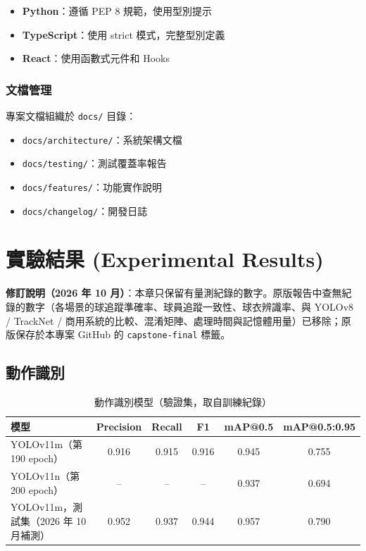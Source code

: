 \documentclass[a4paper,14pt,oneside]{article}
\begin{document}
\begin{itemize}
    \item \textbf{Python}：遵循 PEP 8 規範，使用型別提示
    \item \textbf{TypeScript}：使用 strict 模式，完整型別定義
    \item \textbf{React}：使用函數式元件和 Hooks
\end{itemize}

\subsubsection{文檔管理}

專案文檔組織於 \texttt{docs/} 目錄：

\begin{itemize}
    \item \texttt{docs/architecture/}：系統架構文檔
    \item \texttt{docs/testing/}：測試覆蓋率報告
    \item \texttt{docs/features/}：功能實作說明
    \item \texttt{docs/changelog/}：開發日誌
\end{itemize}

\newpage
\section{實驗結果 (Experimental Results)}\label{sec:results}

\textbf{修訂說明（2026 年 10 月）}：本章只保留有量測紀錄的數字。原版報告中查無紀錄的數字（各場景的球追蹤準確率、球員追蹤一致性、球衣辨識率、與 YOLOv8 / TrackNet / 商用系統的比較、混淆矩陣、處理時間與記憶體用量）已移除；原版保存於本專案 GitHub 的 \texttt{capstone-final} 標籤。

\subsection{動作識別}

\begin{table}[H]
    \centering
    \caption{動作識別模型（驗證集，取自訓練紀錄）}
    \begin{tabular}{|l|c|c|c|c|c|}
        \hline
        \textbf{模型} & \textbf{Precision} & \textbf{Recall} & \textbf{F1} & \textbf{mAP@0.5} & \textbf{mAP@0.5:0.95} \\
        \hline
        YOLOv11m（第 190 epoch） & 0.916 & 0.915 & 0.916 & 0.945 & 0.755 \\
        \hline
        YOLOv11n（第 200 epoch） & -- & -- & -- & 0.937 & 0.694 \\
        \hline
        YOLOv11m，測試集（2026 年 10 月補測） & 0.952 & 0.937 & 0.944 & 0.957 & 0.790 \\
        \hline
    \end{tabular}
\end{table}
\end{document}
